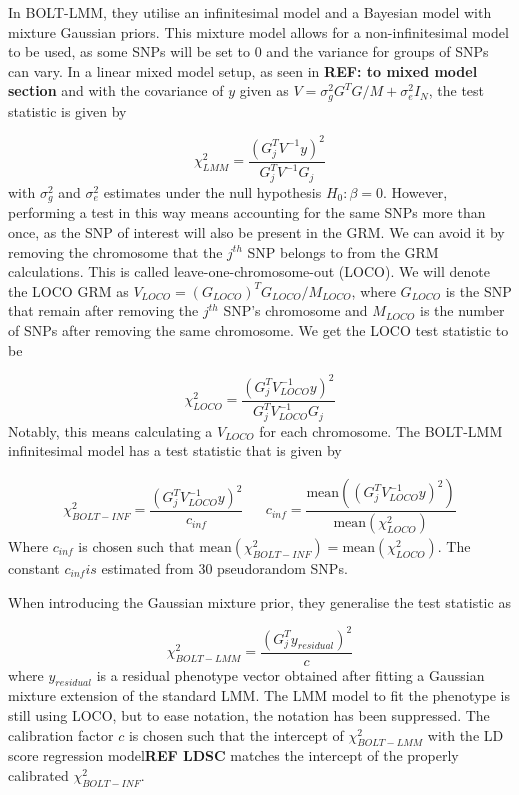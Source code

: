 In BOLT-LMM, they utilise an infinitesimal model and a Bayesian model with mixture Gaussian priors. This mixture model allows for a non-infinitesimal model to be used, as some SNPs will be set to $ 0 $ and the variance for groups of SNPs can vary.  In a linear mixed model setup, as seen in \textbf{REF: to mixed model section} and with the covariance of $ y $ given as $V = \sigma_g^2G^TG/M + \sigma_e^2I_N $, the test statistic is given by

\begin{equation}\label{eq:boltLMMchisq}
\chi^2_{LMM} = \dfrac{(G_j^TV^{-1}y)^2}{G_j^TV^{-1}G_j}
\end{equation}
with $ \sigma_g^2 $ and $ \sigma_e^2 $ estimates under the null hypothesis $ H_0: \beta = 0 $. However, performing a test in this way means accounting for the same SNPs more than once, as the SNP of interest will also be present in the GRM. We can avoid it by removing the chromosome that the $ j^{th} $ SNP belongs to from the GRM calculations. This is called leave-one-chromosome-out (LOCO). We will denote the LOCO GRM as $ V_{LOCO} = (G_{LOCO})^TG_{LOCO}/M_{LOCO}$, where $ G_{LOCO} $ is the SNP that remain after removing the $ j^{th} $ SNP's chromosome and $ M_{LOCO} $ is the number of SNPs after removing the same chromosome. We get the LOCO test statistic to be

\begin{equation}\label{eq:boltLMMchisqLOCO}
\chi^2_{LOCO} = \dfrac{(G_j^TV_{LOCO}^{-1}y)^2}{G_j^TV_{LOCO}^{-1}G_j}
\end{equation}
Notably, this means calculating a $ V_{LOCO} $ for each chromosome. The BOLT-LMM infinitesimal model has a test statistic that is given by

\begin{align}\label{eq:boltLMMinfchisq}
\chi^2_{BOLT-INF} = \dfrac{(G_j^TV_{LOCO}^{-1}y)^2}{c_{inf}} & &c_{inf} = \dfrac{\text{mean}((G_j^TV_{LOCO}^{-1}y)^2)}{\text{mean}(\chi^2_{LOCO})}
\end{align}
Where $ c_{inf} $ is chosen such that $ \text{mean}(\chi^2_{BOLT-INF}) = \text{mean}(\chi^2_{LOCO})$. The constant $ c_{inf} is $ estimated from $ 30 $ pseudorandom SNPs.

When introducing the Gaussian mixture prior, they generalise the test statistic as

\begin{equation}\label{eq:boltMixturePriorTestChisq}
\chi^2_{BOLT-LMM} = \dfrac{\left( G_j^T y_{residual}\right)^2}{c}
\end{equation}
where $ y_{residual} $ is a residual phenotype vector obtained after fitting a Gaussian mixture extension of the standard LMM. The LMM model to fit the phenotype is still using LOCO, but to ease notation, the notation has been suppressed. The calibration factor $ c $ is chosen such that the intercept of $ \chi^2_{BOLT-LMM} $ with the LD score regression model\textbf{REF LDSC} matches the intercept of the properly calibrated $ \chi^2_{BOLT-INF} $.

